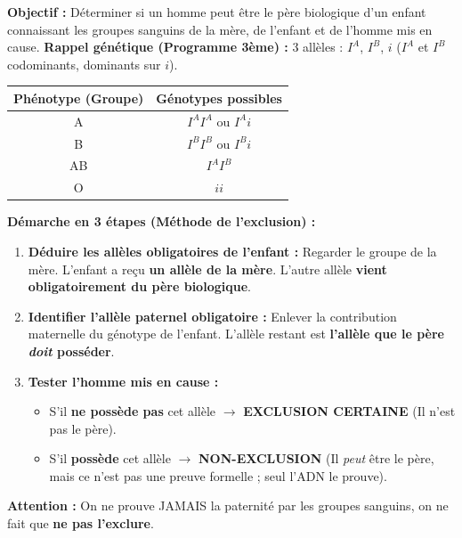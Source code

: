 \documentclass[11pt]{article}
\begin{document}
\begin{methode}
\textbf{Objectif :} Déterminer si un homme peut être le père biologique d'un enfant connaissant les groupes sanguins de la mère, de l'enfant et de l'homme mis en cause.
\textbf{Rappel génétique (Programme 3ème) :} 3 allèles : $I^A$, $I^B$, $i$ ($I^A$ et $I^B$ codominants, dominants sur $i$).
\begin{center}
\begin{tabular}{|c|c|}\hline
\rowcolor{popblueL} \textbf{Phénotype (Groupe)} & \textbf{Génotypes possibles} \\ \hline
A & $I^A I^A$ ou $I^A i$ \\ \hline
B & $I^B I^B$ ou $I^B i$ \\ \hline
AB & $I^A I^B$ \\ \hline
O & $ii$ \\ \hline
\end{tabular}
\end{center}
\textbf{Démarche en 3 étapes (Méthode de l'exclusion) :}
\begin{enumerate}
    \item \textbf{Déduire les allèles obligatoires de l'enfant :} Regarder le groupe de la mère. L'enfant a reçu \textbf{un allèle de la mère}. L'autre allèle \textbf{vient obligatoirement du père biologique}.
    \item \textbf{Identifier l'allèle paternel obligatoire :} Enlever la contribution maternelle du génotype de l'enfant. L'allèle restant est \textbf{l'allèle que le père \emph{doit} posséder}.
    \item \textbf{Tester l'homme mis en cause :} 
    \begin{itemize}
        \item S'il \textbf{ne possède pas} cet allèle $\rightarrow$ \textbf{EXCLUSION CERTAINE} (Il n'est pas le père).
        \item S'il \textbf{possède} cet allèle $\rightarrow$ \textbf{NON-EXCLUSION} (Il \emph{peut} être le père, mais ce n'est pas une preuve formelle ; seul l'ADN le prouve).
    \end{itemize}
\end{enumerate}
\textbf{Attention :} On ne prouve JAMAIS la paternité par les groupes sanguins, on ne fait que \textbf{ne pas l'exclure}.
\end{methode}
\end{document}
